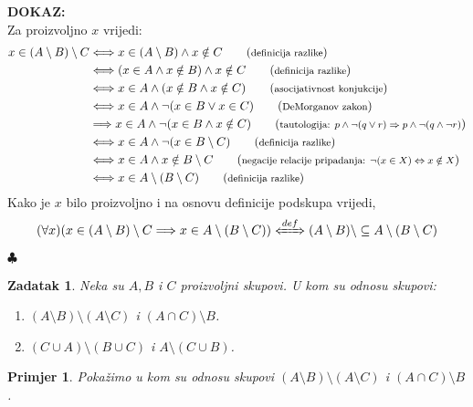 \documentclass{article}
\newcommand{\kom}[1]{\tag{\textrm{\footnotesize #1}}\\}
\newtheorem{zadatak}{Zadatak}
\newtheorem{primjer}{Primjer}
\newenvironment{dokaz}
    {\noindent\textbf{DOKAZ:}\\} {\hfill $\clubsuit$}
\begin{document}
\begin{dokaz}

    Za proizvoljno $x$ vrijedi:
    \begin{align*}
        x\in (A\setminus B)\setminus C  &\Longleftrightarrow    x\in (A\setminus B)\land x\notin C          \kom{definicija razlike}
                                        &\Longleftrightarrow    (x\in A\land x\notin B)\land x\notin C      \kom{definicija razlike}
                                        &\Longleftrightarrow    x\in A\land (x\notin B\land x\notin C)      \kom{asocijativnost konjukcije}
                                        &\Longleftrightarrow    x\in A\land\lnot (x\in B\lor x\in C)        \kom{DeMorganov zakon}
                                        &\Longrightarrow        x\in A\land\lnot (x\in B\land x\notin C)    \kom{tautologija: $p\land\lnot (q\lor r)\Rightarrow p\land\lnot (q\land\lnot r)$}
                                        &\Longleftrightarrow    x\in A\land\lnot (x\in B\setminus C)        \kom{definicija razlike}
                                        &\Longleftrightarrow    x\in A\land x\notin B\setminus C            \kom{negacije relacije pripadanja: $\lnot (x\in X)\Leftrightarrow x\notin X$}
                                        &\Longleftrightarrow    x\in A\setminus (B\setminus C)              \kom{definicija razlike}
    \end{align*}
    Kako je $x$ bilo proizvoljno i na osnovu definicije podskupa vrijedi,
    $$(\forall x)(x\in (A\setminus B)\setminus C\Longrightarrow x\in A\setminus (B\setminus C))\xLeftrightarrow{def}(A\setminus B)\setminus \subseteq  A\setminus (B\setminus C)$$
\end{dokaz}

\newpage
\begin{zadatak}
    Neka su $A, B$ i $C$ proizvoljni skupovi. U kom su odnosu skupovi:
    \begin{enumerate}
        \item $(A\setminus B)\setminus (A\setminus C)$ i $(A\cap C)\setminus B$.
        \item $(C\cup A)\setminus (B\cup C)$ i $A\setminus (C\cup B)$.
    \end{enumerate}
\end{zadatak}   

\vskip 1cm

\begin{primjer}
    Pokažimo u kom su odnosu skupovi $(A\setminus B)\setminus (A\setminus C)$ i $(A\cap C)\setminus B$.
\end{primjer}
\end{document}
